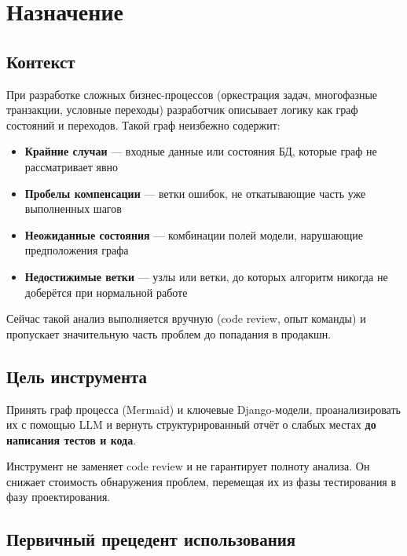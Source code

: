 \documentclass[11pt, a4paper, oneside]{article}
\begin{document}
\tableofcontents
\newpage

\section{Назначение}

\subsection{Контекст}

При разработке сложных бизнес-процессов (оркестрация задач, многофазные
транзакции, условные переходы) разработчик описывает логику как граф
состояний и переходов. Такой граф неизбежно содержит:

\begin{itemize}
  \item \textbf{Крайние случаи} — входные данные или состояния БД,
    которые граф не рассматривает явно
  \item \textbf{Пробелы компенсации} — ветки ошибок, не откатывающие
    часть уже выполненных шагов
  \item \textbf{Неожиданные состояния} — комбинации полей модели,
    нарушающие предположения графа
  \item \textbf{Недостижимые ветки} — узлы или ветки, до которых
    алгоритм никогда не доберётся при нормальной работе
\end{itemize}

Сейчас такой анализ выполняется вручную (code review, опыт команды)
и пропускает значительную часть проблем до попадания в продакшн.

\subsection{Цель инструмента}

\begin{infobox}[title={Цель}]
Принять граф процесса (Mermaid) и ключевые Django-модели,
проанализировать их с помощью LLM и вернуть структурированный
отчёт о слабых местах \textbf{до написания тестов и кода}.
\end{infobox}

Инструмент не заменяет code review и не гарантирует полноту анализа.
Он снижает стоимость обнаружения проблем, перемещая их из фазы тестирования
в фазу проектирования.

\subsection{Первичный прецедент использования}
\end{document}
